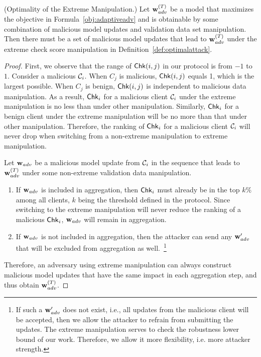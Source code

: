 \begin{theorem}(Optimality of the Extreme Manipulation.)
\label{thm:optimal}
    Let $\mathbf{w}^{(T)}_{adv}$ be a model that maximizes the objective in Formula~\ref{obj:adaptiveadv} and is obtainable by some combination of malicious model updates and validation data set manipulation. Then there must be a set of malicious model updates that lead to $\mathbf{w}^{(T)}_{adv}$ under the extreme check score manipulation in Definition~\ref{def:optimalattack}.
\end{theorem}

\begin{proof}
    First, we observe that the range of $\mathsf{Chk}(i,j)$ in our protocol is from $-1$ to $1$.
    Consider a malicious $\mathcal{C}_i$. When $C_j$ is malicious, $\mathsf{Chk}(i, j)$ equals 1, which is the largest possible. When $C_j$ is benign, $\mathsf{Chk}(i, j)$ is independent to malicious data manipulation. As a result, $\mathsf{Chk}_i$ for a malicious client $\mathcal{C}_i$ under the extreme manipulation is no less than under other manipulation. Similarly, $\mathsf{Chk}_i$ for a benign client under the extreme manipulation will be no more than that under other manipulation. Therefore, the ranking of $\mathsf{Chk}_i$ for a malicious client $\mathcal{C}_i$ will never drop when switching from a non-extreme manipulation to extreme manipulation.

    Let $\mathbf{w}_{adv}$ be a malicious model update from $\mathcal{C}_i$ in the sequence that leads to $\mathbf{w}^{(T)}_{adv}$ under some non-extreme validation data manipulation.
    \begin{enumerate}
        \item
        If $\mathbf{w}_{adv}$ is included in aggregation, then $\mathsf{Chk}_i$ must already be in the top $k\%$ among all clients, $k$ being the threshold defined in the protocol. Since switching to the extreme manipulation will never reduce the ranking of a malicious $\mathsf{Chk}_i$, $\mathbf{w}_{adv}$ will remain in aggregation. 
        \item
        If $\mathbf{w}_{adv}$ is not included in aggregation, then the attacker can send any $\mathbf{w}'_{adv}$ that will be excluded from aggregation as well.~\footnote{If such a $\mathbf{w}'_{adv}$ does not exist, i.e., all updates from the malicious client will be accepted, then we allow the attacker to refrain from submitting the updates. The extreme manipulation serves to check the robustness lower bound of our work. Therefore, we allow it more flexibility, i.e. more attacker strength.}
    \end{enumerate}
    Therefore, an adversary using extreme manipulation can always construct malicious model updates that have the same impact in each aggregation step, and thus obtain $\mathbf{w}^{(T)}_{adv}$.
\end{proof}

